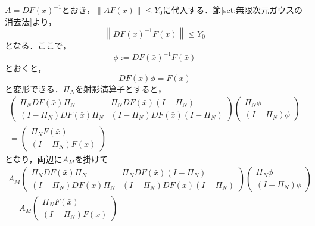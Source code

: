 $A=DF(\bar{x})^{-1}$とおき，$\| AF(\bar{x}) \| \leq Y_0$に代入する．節\ref{sct:無限次元ガウスの消去法}より，
\begin{equation}
  \left \| DF(\bar{x})^{-1} F(\bar{x}) \right \| \leq Y_0
\end{equation}
となる．ここで，
\begin{equation*}
  \phi:=DF(\bar{x})^{-1} F(\bar{x})
\end{equation*}
とおくと，
\begin{equation*}
  DF(\bar{x}) \phi = F(\bar{x})
\end{equation*}
と変形できる．$\Pi_N$を射影演算子とすると，
\begin{equation}
    \begin{split}
    \begin{pmatrix}
      \Pi_N DF(\bar{x}) \Pi_N & \Pi_N DF(\bar{x}) (I-\Pi_N) \\
      (I-\Pi_N) DF(\bar{x}) \Pi_N & (I-\Pi_N) DF(\bar{x}) (I-\Pi_N)
    \end{pmatrix}
    \begin{pmatrix}
      \Pi_N \phi \\
      (I-\Pi_N) \phi
    \end{pmatrix}
    \\=
    \begin{pmatrix}
      \Pi_N F(\bar{x}) \\
      (I - \Pi_N) F(\bar{x})
    \end{pmatrix}
  \end{split}
\end{equation}
となり，両辺に$A_M$を掛けて
\begin{equation}
  \label{eq:y0-1}
  \begin{split}
  A_M
    \begin{pmatrix}
      \Pi_N DF(\bar{x}) \Pi_N & \Pi_N DF(\bar{x}) (I-\Pi_N) \\
      (I-\Pi_N) DF(\bar{x}) \Pi_N & (I-\Pi_N) DF(\bar{x}) (I-\Pi_N)
    \end{pmatrix}
    \begin{pmatrix}
      \Pi_N \phi \\
      (I-\Pi_N) \phi
    \end{pmatrix}
    \\=A_M
    \begin{pmatrix}
      \Pi_N F(\bar{x}) \\
      (I - \Pi_N) F(\bar{x})
    \end{pmatrix}
  \end{split}
\end{equation}

